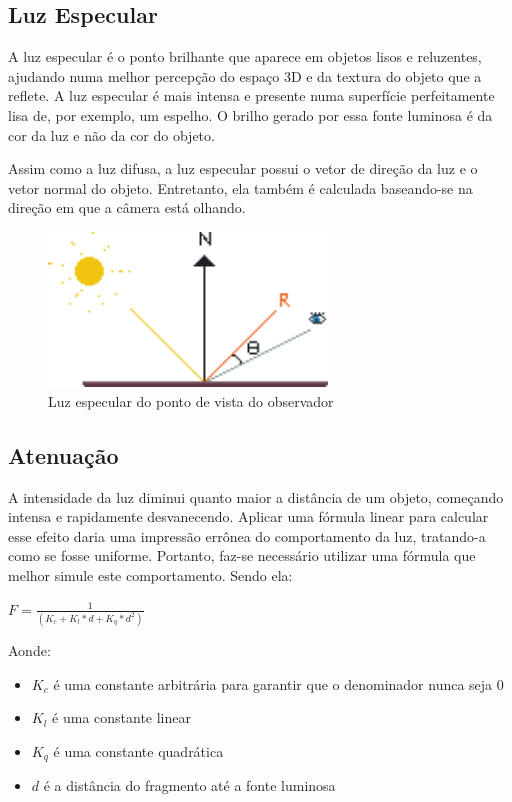 \documentclass[12pt, 
openright, 
oneside, 
a4paper,    
brazil]{facom-ufu-abntex2}
\begin{document}
\subsection{Luz Especular}
A luz especular é o ponto brilhante que aparece em objetos lisos e reluzentes, ajudando numa melhor percepção do espaço 3D e da textura do objeto que a reflete. A luz especular é mais intensa e presente numa superfície perfeitamente lisa de, por exemplo, um espelho. O brilho gerado por essa fonte luminosa é da cor da luz e não da cor do objeto.

Assim como a luz difusa, a luz especular possui o vetor de direção da luz e o vetor normal do objeto. Entretanto, ela também é calculada baseando-se na direção em que a câmera está olhando.


\begin{figure}[H]
	\centering
	\includegraphics[width=20em]{imagens/specular.png}
	\caption{Luz especular do ponto de vista do observador}
\end{figure}

\subsection{Atenuação}
A intensidade da luz diminui quanto maior a distância de um objeto, começando intensa e rapidamente desvanecendo. Aplicar uma fórmula linear para calcular esse efeito daria uma impressão errônea do comportamento da luz, tratando-a como se fosse uniforme. Portanto, faz-se necessário utilizar uma fórmula que melhor simule este comportamento. Sendo ela:

\begin{center}
$F = \frac{1} {(K_c + K_l*d + K_q*d^2)}$
\end{center}

Aonde:
\begin{itemize}
    \item $K_c$ é uma constante arbitrária para garantir que o denominador nunca seja 0
     \item $K_l$ é uma constante linear
     \item $K_q$ é uma constante quadrática
     \item $d$ é a distância do fragmento até a fonte luminosa
\end{itemize}
\end{document}
